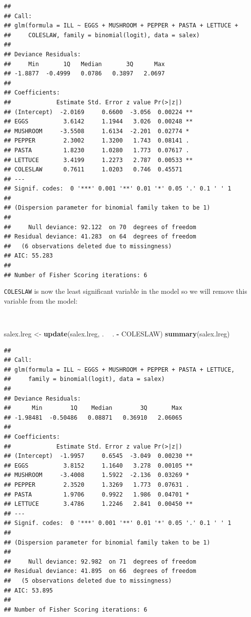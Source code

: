 \documentclass[12pt,a4paper]{book}
\newenvironment{Shaded}{\begin{snugshade}}{\end{snugshade}}
\newcommand{\KeywordTok}[1]{\textcolor[rgb]{0.13,0.29,0.53}{\textbf{#1}}}
\newcommand{\NormalTok}[1]{#1}
\newcommand{\OperatorTok}[1]{\textcolor[rgb]{0.81,0.36,0.00}{\textbf{#1}}}
\newcommand{\StringTok}[1]{\textcolor[rgb]{0.31,0.60,0.02}{#1}}
\theoremstyle{definition}
\theoremstyle{definition}
\theoremstyle{definition}
\theoremstyle{remark}
\begin{document}
\begin{verbatim}
## 
## Call:
## glm(formula = ILL ~ EGGS + MUSHROOM + PEPPER + PASTA + LETTUCE + 
##     COLESLAW, family = binomial(logit), data = salex)
## 
## Deviance Residuals: 
##     Min       1Q   Median       3Q      Max  
## -1.8877  -0.4999   0.0786   0.3897   2.0697  
## 
## Coefficients:
##             Estimate Std. Error z value Pr(>|z|)   
## (Intercept)  -2.0169     0.6600  -3.056  0.00224 **
## EGGS          3.6142     1.1944   3.026  0.00248 **
## MUSHROOM     -3.5508     1.6134  -2.201  0.02774 * 
## PEPPER        2.3002     1.3200   1.743  0.08141 . 
## PASTA         1.8230     1.0280   1.773  0.07617 . 
## LETTUCE       3.4199     1.2273   2.787  0.00533 **
## COLESLAW      0.7611     1.0203   0.746  0.45571   
## ---
## Signif. codes:  0 '***' 0.001 '**' 0.01 '*' 0.05 '.' 0.1 ' ' 1
## 
## (Dispersion parameter for binomial family taken to be 1)
## 
##     Null deviance: 92.122  on 70  degrees of freedom
## Residual deviance: 41.283  on 64  degrees of freedom
##   (6 observations deleted due to missingness)
## AIC: 55.283
## 
## Number of Fisher Scoring iterations: 6
\end{verbatim}

\newpage

\texttt{COLESLAW} is now the least significant variable in the model so
we will remove this variable from the model:

~

\begin{Shaded}
\begin{Highlighting}[]
\NormalTok{salex.lreg <-}\StringTok{ }\KeywordTok{update}\NormalTok{(salex.lreg, . }\OperatorTok{~}\StringTok{ }\NormalTok{. }\OperatorTok{-}\StringTok{ }\NormalTok{COLESLAW)}
\KeywordTok{summary}\NormalTok{(salex.lreg)}
\end{Highlighting}
\end{Shaded}

\begin{verbatim}
## 
## Call:
## glm(formula = ILL ~ EGGS + MUSHROOM + PEPPER + PASTA + LETTUCE, 
##     family = binomial(logit), data = salex)
## 
## Deviance Residuals: 
##      Min        1Q    Median        3Q       Max  
## -1.98481  -0.50486   0.08871   0.36910   2.06065  
## 
## Coefficients:
##             Estimate Std. Error z value Pr(>|z|)   
## (Intercept)  -1.9957     0.6545  -3.049  0.00230 **
## EGGS          3.8152     1.1640   3.278  0.00105 **
## MUSHROOM     -3.4008     1.5922  -2.136  0.03269 * 
## PEPPER        2.3520     1.3269   1.773  0.07631 . 
## PASTA         1.9706     0.9922   1.986  0.04701 * 
## LETTUCE       3.4786     1.2246   2.841  0.00450 **
## ---
## Signif. codes:  0 '***' 0.001 '**' 0.01 '*' 0.05 '.' 0.1 ' ' 1
## 
## (Dispersion parameter for binomial family taken to be 1)
## 
##     Null deviance: 92.982  on 71  degrees of freedom
## Residual deviance: 41.895  on 66  degrees of freedom
##   (5 observations deleted due to missingness)
## AIC: 53.895
## 
## Number of Fisher Scoring iterations: 6
\end{verbatim}
\end{document}
